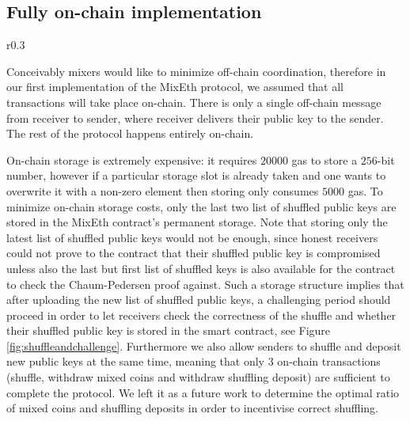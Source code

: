\documentclass[a4paper]{article}
\theoremstyle{definition}
\begin{document}
\subsection{Fully on-chain implementation} \label{fullyonchainimpl}

\begin{wrapfigure}{r}{0.3\textwidth}
	\centering
{}
\captionsetup{justification=centering}
\caption{Shuffle-and-challenge paradigm implemented for the fully on-chain version of MixEth}
\label{fig:shuffleandchallenge}
\end{wrapfigure}

Conceivably mixers would like to minimize off-chain coordination, therefore in our first implementation of the MixEth protocol, we assumed that all transactions will take place on-chain. There is only a single off-chain message from receiver to sender, where receiver delivers their public key to the sender. The rest of the protocol happens entirely on-chain.

On-chain storage is extremely expensive: it requires $\num[group-separator={,}]{20000}$ gas to store a $256$-bit number, however if a particular storage slot is already taken and one wants to overwrite it with a non-zero element then storing only consumes $\num[group-separator={,}]{5000}$ gas. To minimize on-chain storage costs, only the last two list of shuffled public keys are stored in the MixEth contract's permanent storage. Note that storing only the latest list of shuffled public keys would not be enough, since honest receivers could not prove to the contract that their shuffled public key is compromised unless also the last but first list of shuffled keys is also available for the contract to check the Chaum-Pedersen proof against. Such a storage structure implies that after uploading the new list of shuffled public keys, a challenging period should proceed in order to let receivers check the correctness of the shuffle and whether their shuffled public key is stored in the smart contract, see Figure \ref{fig:shuffleandchallenge}. Furthermore we also allow senders to shuffle and deposit new public keys at the same time, meaning that only $3$ on-chain transactions (shuffle, withdraw mixed coins and withdraw shuffling deposit) are sufficient to complete the protocol. We left it as a future work to determine the optimal ratio of mixed coins and shuffling deposits in order to incentivise correct shuffling.
\end{document}
